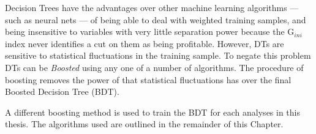 Decision Trees have the advantages over other machine learning algorithms ---
such as neural nets --- of being able to deal with weighted training samples, and being insensitive
to variables with very little separation power because the
$\mathrm{G}_{ini}$ index never identifies a cut on them as being profitable.
However, DTs are sensitive to statistical fluctuations in the training sample.
To negate this problem DTs can be \emph{Boosted} using any one of a number of algorithms.
The procedure of boosting removes the power of that statistical fluctuations has over the final
Boosted Decision Tree (BDT).

A different boosting method is used to train the BDT for each analyses in this thesis.
The algorithms used are outlined in the remainder of this Chapter.


